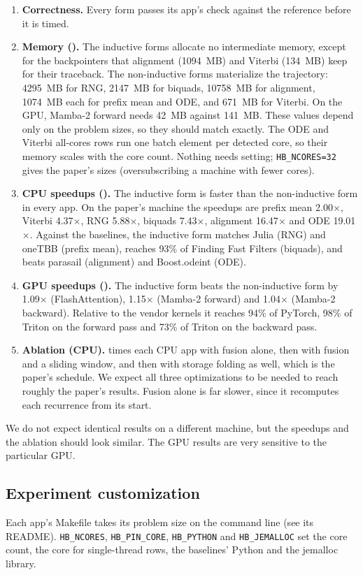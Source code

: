\begin{enumerate}
  \item \textbf{Correctness.} Every form passes its app's check against the
    reference before it is timed.
  \item \textbf{Memory ().} The inductive
    forms allocate no intermediate memory, except for the backpointers that
    alignment (1094~MB) and Viterbi (134~MB) keep for their traceback. The
    non-inductive forms materialize the trajectory: 4295~MB for RNG,
    2147~MB for biquads, 10758~MB for alignment, 1074~MB each for prefix
    mean and ODE, and 671~MB for Viterbi. On the GPU, Mamba-2 forward needs
    42~MB against 141~MB. These values depend only on the problem sizes, so
    they should match exactly. The ODE and Viterbi all-cores rows run one
    batch element per detected core, so their memory scales with the core
    count. Nothing needs setting; \texttt{HB\_NCORES=32} gives the paper's
    sizes (oversubscribing a machine with fewer cores).
  \item \textbf{CPU speedups ().} The
    inductive form is faster than the non-inductive form in every app. On
    the paper's machine the speedups are prefix mean 2.00$\times$, Viterbi
    4.37$\times$, RNG 5.88$\times$, biquads 7.43$\times$, alignment
    16.47$\times$ and ODE 19.01$\times$. Against the baselines, the inductive
    form matches Julia (RNG) and oneTBB (prefix mean), reaches 93\% of
    Finding Fast Filters (biquads), and beats parasail (alignment) and
    Boost.odeint (ODE).
  \item \textbf{GPU speedups ().} The
    inductive form beats the non-inductive form by 1.09$\times$
    (FlashAttention), 1.15$\times$ (Mamba-2 forward) and 1.04$\times$
    (Mamba-2 backward). Relative to the vendor kernels it reaches 94\% of
    PyTorch, 98\% of Triton on the forward pass and 73\% of Triton on the
    backward pass.
  \item \textbf{Ablation (CPU).}  times each CPU app
    with fusion alone, then with fusion and a sliding window, and then with
    storage folding as well, which is the paper's schedule. We expect all
    three optimizations to be needed to reach roughly the paper's results.
    Fusion alone is far slower, since it recomputes each recurrence from its
    start.
\end{enumerate}

We do not expect identical results on a different machine, but the
speedups and the ablation should look similar. The GPU results are very
sensitive to the particular GPU.

\subsection{Experiment customization}

Each app's Makefile takes its problem size on the command line (see its
README). \texttt{HB\_NCORES}, \texttt{HB\_PIN\_CORE}, \texttt{HB\_PYTHON}
and \texttt{HB\_JEMALLOC} set the core count, the core for single-thread
rows, the baselines' Python and the jemalloc library.
